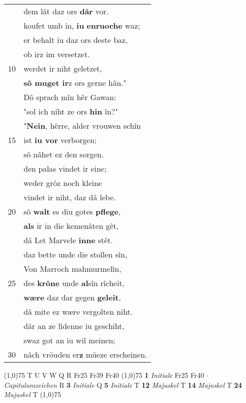 \documentclass[8pt,a4paper,notitlepage]{article}
\begin{document}
\begin{table}[ht]
\begin{minipage}[t]{0.5\linewidth}
\begin{tabular}{rl}
 & dem lât daz ors \textbf{dâr} vor.\\ 
 & koufet umb in, \textbf{iu} \textbf{en}\textbf{ruoche} waz;\\ 
 & er behalt iu daz ors deste baz,\\ 
 & ob irz im versetzet.\\ 
10 & werdet ir niht geletzet,\\ 
 & \textbf{sô muget ir}z ors gerne hân."\\ 
 & Dô sprach mîn hêr Gawan:\\ 
 & "sol ich niht ze ors \textbf{hin} în?"\\ 
 & "\textbf{Nein}, hêrre, alder vrouwen schîn\\ 
15 & ist \textbf{iu vor} verborgen;\\ 
 & sô nâhet ez den sorgen.\\ 
 & den palas vindet ir eine;\\ 
 & weder grôz noch kleine\\ 
 & vindet ir niht, daz dâ lebe.\\ 
20 & sô \textbf{walt} es diu gotes \textbf{pflege},\\ 
 & \textbf{als} ir in die kemenâten gêt,\\ 
 & dâ Let Marvele \textbf{inne} stêt.\\ 
 & daz bette unde die stollen sîn,\\ 
 & Von Marroch mahmurmelîn,\\ 
25 & des \textbf{krône} unde \textbf{al}sîn rîcheit,\\ 
 & \textbf{wære} daz dar gegen \textbf{geleit},\\ 
 & dâ mite ez wære vergolten niht.\\ 
 & dâr an ze lîdenne iu geschiht,\\ 
 & swaz got an iu wil meinen;\\ 
30 & nâch vröuden er\textbf{z} müeze erscheinen.\\ 
\end{tabular}
\scriptsize
\line(1,0){75} \newline
T U V W Q R Fr25 Fr39 Fr40 \newline
\line(1,0){75} \newline
\textbf{1} \textit{Initiale} Fr25 Fr40   $\cdot$ \textit{Capitulumzeichen} R  \textbf{3} \textit{Initiale} Q  \textbf{5} \textit{Initiale} T  \textbf{12} \textit{Majuskel} T  \textbf{14} \textit{Majuskel} T  \textbf{24} \textit{Majuskel} T  \newline
\line(1,0){75} \newline

\end{minipage}
\end{table}
\end{document}
